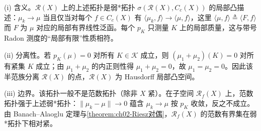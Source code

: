 \documentclass[../../main.tex]{subfiles}%
\begin{document}
\begin{remark}\label{remark:ch02-RX拓扑}
(i) 含义。$\mathscr R(X)$ 上的上述拓扑是弱*拓扑 $\sigma(\mathscr R(X),C_c(X))$ 的局部凸描述：$\mu_k\to\mu$ 当且仅当对每个 $f\in C_c(X)$ 有 $\langle\mu_k,f\rangle\to\langle\mu,f\rangle$，这里 $\langle\mu,f\rangle\triangleq\langle F,f\rangle$ 而 $F$ 为 $\mu$ 对应的局部有界线性泛函。每个 $p_K$ 只测量 $K$ 上的局部质量，这与带号 Radon 测度的“局部有限”性质相符。

(ii) 分离性。若 $p_K(\mu)=0$ 对所有 $K\in\mathscr K$ 成立，则 $(\mu_1+\mu_2)(K)=0$ 对所有紧集 $K$ 成立；由 $\mu_1+\mu_2$ 的内正则性得 $\mu_1+\mu_2=0$，故 $\mu_1=\mu_2=0$。因此该半范族分离 $\mathscr R(X)$ 的点，$\mathscr R(X)$ 为 Hausdorff 局部凸空间。

(iii) 边界。该拓扑一般不是范数拓扑（除非 $X$ 紧）。在子空间 $\mathscr R_f(X)$ 上，范数拓扑强于上述弱*拓扑：$\|\mu_k-\mu\|\to0$ 蕴含 $\mu_k\to\mu$ 按 $p_K$ 收敛，反之不成立。由 Banach–Alaoglu 定理与\cref{theorem:ch02-Riesz对偶}，$\mathscr R_f(X)$ 的范数有界集在弱*拓扑下相对紧。
\end{remark}
\end{document}
